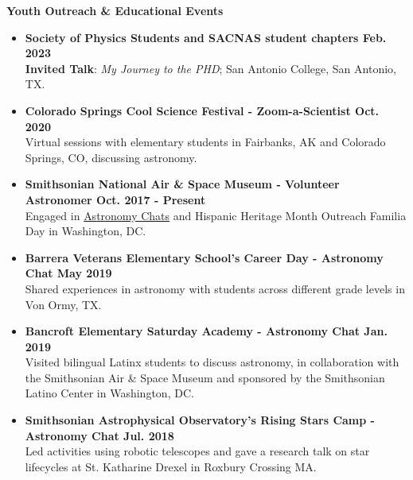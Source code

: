 \documentclass[12pt]{article}
\begin{document}
\noindent
\vspace{-3mm}
{\bf Youth Outreach \& Educational Events} \\
\vspace{-10mm}
\begin{center}
\end{center}
\vspace{-3mm}
\begin{itemize}
    \item \textbf{Society of Physics Students and SACNAS student chapters \hfill Feb. 2023} \\
    \textbf{Invited Talk}: \textit{My Journey to the PHD}; San Antonio College, San Antonio, TX.
    \item \textbf{Colorado Springs Cool Science Festival - Zoom-a-Scientist \hfill Oct. 2020} \\
    Virtual sessions with elementary students in Fairbanks, AK and Colorado Springs, CO, discussing astronomy.
    \item \textbf{Smithsonian National Air \& Space Museum - Volunteer Astronomer \hfill Oct. 2017 - Present} \\
    Engaged in \href{https://airandspace.si.edu/events/astronomy-chat-gabriella-alvarez-and-laura-vega-0}{Astronomy Chats} and Hispanic Heritage Month Outreach Familia Day in Washington, DC.
    \item \textbf{Barrera Veterans Elementary School's Career Day - Astronomy Chat \hfill May 2019} \\
    Shared experiences in astronomy with students across different grade levels in Von Ormy, TX.
    \item \textbf{Bancroft Elementary Saturday Academy - Astronomy Chat \hfill Jan. 2019} \\
    Visited bilingual Latinx students to discuss astronomy, in collaboration with the Smithsonian Air \& Space Museum and sponsored by the Smithsonian Latino Center in Washington, DC.
    \item \textbf{Smithsonian Astrophysical Observatory's Rising Stars Camp - Astronomy Chat  \hfill Jul. 2018} \\
    Led activities using robotic telescopes and gave a research talk on star lifecycles at St. Katharine Drexel in Roxbury Crossing MA.
\end{itemize}

\newpage
\end{document}
